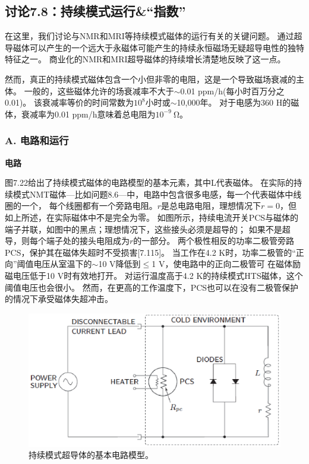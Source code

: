 \subsection{讨论7.8：持续模式运行\&“指数”}
在这里，我们讨论与NMR和MRI等持续模式磁体的运行有关的关键问题。
通过超导磁体可以产生的一个远大于永磁体可能产生的持续永恒磁场无疑超导电性的独特特征之一。
商业化的NMR和MRI超导磁体的持续增长清楚地反映了这一点。

然而，真正的持续模式磁体包含一个小但非零的电阻，这是一个导致磁场衰减的主体。
一般的，这些磁体允许的场衰减率不大于$\sim$0.01 ppm/h(每小时百万分之0.01)。
该衰减率等价的时间常数为$10^8$小时或$\sim$10,000年。
 对于电感为360 H的磁体，衰减率为0.01 ppm/h意味着总电阻为$10^{-9}\ \mathrm{\Omega}$。
 
\subsubsection*{A. 电路和运行}
\textbf{电路}

图7.22给出了持续模式磁体的电路模型的基本元素，其中L代表磁体。
在实际的持续模式NMT磁体---比如问题8.6---中，电路中包含很多电感，每一个代表磁体中线圈的一个，
每个线圈都有一个旁路电阻。$r$是总电路电阻，理想情况下$r = 0$，但如上所述，在实际磁体中不是完全为零。
如图所示，持续电流开关PCS与磁体的端子并联，如图中的黑点；理想情况下，这些接头必须是超导的；
如果不是超导，则每个端子处的接头电阻成为$r$的一部分。
两个极性相反的功率二极管旁路PCS，保护其在磁体失超时不受损害[7.115]。
当工作在4.2 K时，功率二极管的“正向”阈值电压从室温下的$\sim$10 V降低到$\le$1 V，使电路中的正向二极管可
在磁体励磁电压低于10 V时有效地打开。
对运行温度高于4.2 K的持续模式HTS磁体，这个阈值电压也会很小。
然而，在更高的工作温度下，PCS也可以在没有二极管保护的情况下承受磁体失超冲击。

\begin{figure}[htbp]
	\centering
	\includegraphics[scale=0.7]{chpt7/figs/fig7.22.eps}
	\caption{持续模式超导体的基本电路模型。}
\end{figure}

